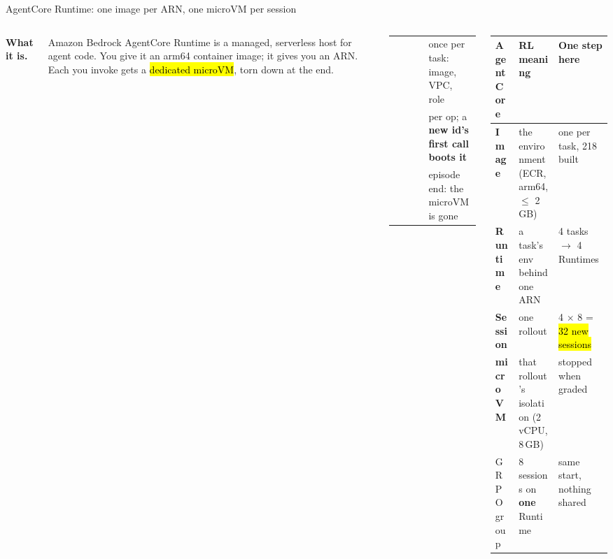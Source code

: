 \begin{frame}{AgentCore Runtime: one image per ARN, one microVM per session}
\begin{columns}[T]
\centering{}\par
\vspace{1.5mm}\raggedright
{\footnotesize\textbf{What it is.}} {\scriptsize Amazon Bedrock AgentCore Runtime is a managed, serverless host for agent code. You give it an arm64 container image; it gives you an ARN. Each  you invoke gets a \hl{dedicated microVM}, torn down at the end.\par}
\vspace{1mm}
\tiny\setlength{\tabcolsep}{3pt}
\begin{tabularx}{\linewidth}{@{}P{0.4\linewidth}Y@{}}
\toprule
{} & once per task: image, VPC, role\\
 & per op; a \textbf{new id's first call boots it}\\
 & episode end: the microVM is gone\\
\bottomrule
\end{tabularx}
\tiny\setlength{\tabcolsep}{3pt}
\begin{tabularx}{\linewidth}{@{}P{0.2\linewidth}P{0.34\linewidth}Y@{}}
\toprule
\textbf{AgentCore} & \textbf{RL meaning} & \textbf{One step here}\\
\midrule
\textbf{Image} & the environment (ECR, arm64, $\le$ 2\,GB) & one per task, 218 built\\
\textbf{Runtime} & a task's env behind one ARN & 4 tasks $\rightarrow$ 4 Runtimes\\
\textbf{Session} & one rollout & 4 $\times$ 8 = \hl{32 new sessions}\\
\textbf{microVM} & that rollout's isolation (2 vCPU, 8\,GB) & stopped when graded\\
GRPO group & 8 sessions on \textbf{one} Runtime & same start, nothing shared\\
\bottomrule
\end{tabularx}
\par\vspace{1mm}

\end{columns}
\end{frame}
